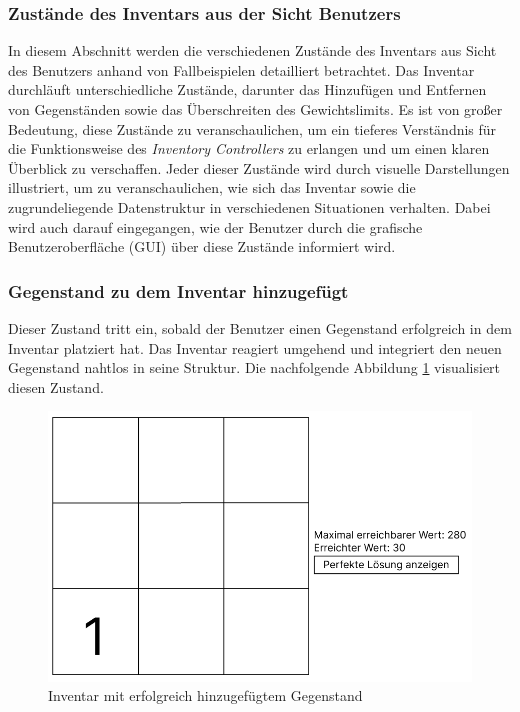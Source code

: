 \subsubsection{Zustände des Inventars aus der Sicht Benutzers}
In diesem Abschnitt werden die verschiedenen Zustände des Inventars aus Sicht des Benutzers anhand von Fallbeispielen
detailliert betrachtet. Das Inventar durchläuft unterschiedliche Zustände, darunter das Hinzufügen und Entfernen von
Gegenständen sowie das Überschreiten des Gewichtslimits. Es ist von großer Bedeutung, diese Zustände zu veranschaulichen,
um ein tieferes Verständnis für die Funktionsweise des \textit{Inventory Controllers} zu erlangen und um einen klaren Überblick
zu verschaffen. Jeder dieser Zustände wird durch visuelle Darstellungen illustriert, um zu veranschaulichen, wie sich das
Inventar sowie die zugrundeliegende Datenstruktur in verschiedenen Situationen verhalten. Dabei wird auch darauf eingegangen,
wie der Benutzer durch die grafische Benutzeroberfläche (GUI) über diese Zustände informiert wird.

\subsubsection*{Gegenstand zu dem Inventar hinzugefügt}
Dieser Zustand tritt ein, sobald der Benutzer einen Gegenstand erfolgreich in dem Inventar platziert hat. Das Inventar
reagiert umgehend und integriert den neuen Gegenstand nahtlos in seine Struktur. Die nachfolgende Abbildung \ref{fig:controller_itemAdded}
visualisiert diesen Zustand.

\begin{figure}[H]
    \centering
    \includegraphics[scale=0.5]{images/itemAdded}
    \caption{Inventar mit erfolgreich hinzugefügtem Gegenstand}
    \label{fig:controller_itemAdded}
\end{figure}

